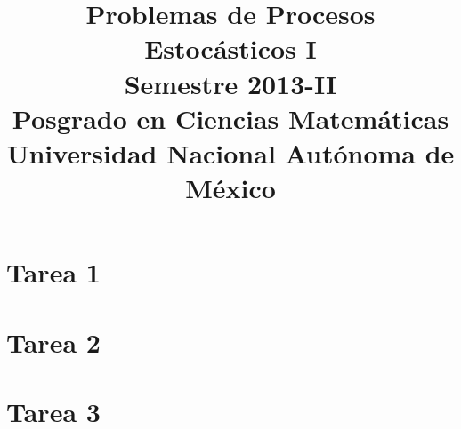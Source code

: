 \documentclass[a5paper,oneside]{amsart}
\title[Problemas de Procesos I]{
	Problemas de Procesos Estocásticos I\\ Semestre 2013-II\\ Posgrado en Ciencias Matemáticas\\ Universidad Nacional Autónoma de México
}
\theoremstyle{dotless}
\begin{document}
	\maketitle
	\section{Tarea 1}
		
		
		\nqed
		
	\section{Tarea 2}
		
		
		\nqed
		
	\section{Tarea 3}
		
		
		\nqed
		
	
	
\end{document}
